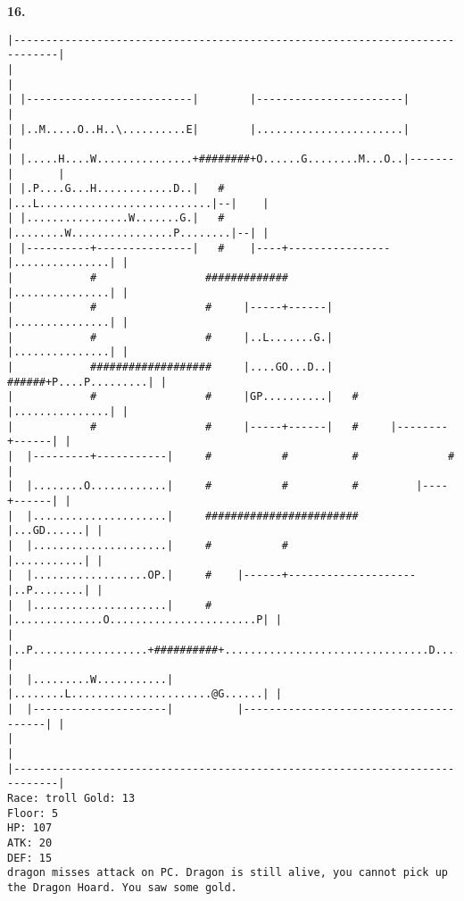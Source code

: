 \documentclass[11pt]{article}
\theoremstyle{plain}
\begin{document}
\newpage
\textbf{16. }
\begin{Verbatim}[fontsize=\scriptsize]
|-----------------------------------------------------------------------------|
|                                                                             |
| |--------------------------|        |-----------------------|               |
| |..M.....O..H..\..........E|        |.......................|               |
| |.....H....W...............+########+O......G........M...O..|-------|       |
| |.P....G...H............D..|   #    |...L...........................|--|    |
| |................W.......G.|   #    |........W................P........|--| |
| |----------+---------------|   #    |----+----------------|...............| |
|            #                 #############                |...............| |
|            #                 #     |-----+------|         |...............| |
|            #                 #     |..L.......G.|         |...............| |
|            ###################     |....GO...D..|   ######+P....P.........| |
|            #                 #     |GP..........|   #     |...............| |
|            #                 #     |-----+------|   #     |--------+------| |
|  |---------+-----------|     #           #          #              #        |
|  |........O............|     #           #          #         |----+------| |
|  |.....................|     ########################         |...GD......| |
|  |.....................|     #           #                    |...........| |
|  |..................OP.|     #    |------+--------------------|..P........| |
|  |.....................|     #    |..............O.......................P| |
|  |..P..................+##########+................................D......| |
|  |.........W...........|          |........L......................@G......| |
|  |---------------------|          |---------------------------------------| |
|                                                                             |
|-----------------------------------------------------------------------------|
Race: troll Gold: 13                                                   Floor: 5
HP: 107
ATK: 20
DEF: 15
dragon misses attack on PC. Dragon is still alive, you cannot pick up the Dragon Hoard. You saw some gold. 
\end{Verbatim}
\end{document}
